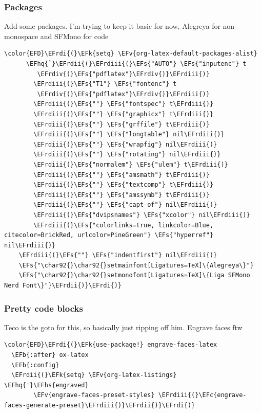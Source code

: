 \documentclass{scrartcl}
\newcommand{\EFk}[1]{\textcolor{EFk}{#1}} %
\newcommand{\EFs}[1]{\textcolor{EFs}{#1}} %
\newcommand{\EFb}[1]{\textcolor{EFb}{#1}} %
\newcommand{\EFc}[1]{\textcolor{EFc}{#1}} %
\newcommand{\EFv}[1]{\textcolor{EFv}{#1}} %
\newcommand{\EFhq}[1]{#1} %
\newcommand{\EFhs}[1]{#1} %
\newcommand{\EFrdi}[1]{#1} %
\newcommand{\EFrdii}[1]{#1} %
\newcommand{\EFrdiii}[1]{#1} %
\newcommand{\EFrdiv}[1]{#1} %
\begin{document}
\subsubsection{Packages}
\label{sec:orge36119a}
Add some packages. I'm trying to keep it basic for now, Alegreya for
non-monospace and SFMono for code
\begin{Code}
\begin{Verbatim}[]
\color{EFD}\EFrdi{(}\EFk{setq} \EFv{org-latex-default-packages-alist}
      \EFhq{`}\EFrdii{(}\EFrdiii{(}\EFs{"AUTO"} \EFs{"inputenc"} t
         \EFrdiv{(}\EFs{"pdflatex"}\EFrdiv{)}\EFrdiii{)}
        \EFrdiii{(}\EFs{"T1"} \EFs{"fontenc"} t
         \EFrdiv{(}\EFs{"pdflatex"}\EFrdiv{)}\EFrdiii{)}
        \EFrdiii{(}\EFs{""} \EFs{"fontspec"} t\EFrdiii{)}
        \EFrdiii{(}\EFs{""} \EFs{"graphicx"} t\EFrdiii{)}
        \EFrdiii{(}\EFs{""} \EFs{"grffile"} t\EFrdiii{)}
        \EFrdiii{(}\EFs{""} \EFs{"longtable"} nil\EFrdiii{)}
        \EFrdiii{(}\EFs{""} \EFs{"wrapfig"} nil\EFrdiii{)}
        \EFrdiii{(}\EFs{""} \EFs{"rotating"} nil\EFrdiii{)}
        \EFrdiii{(}\EFs{"normalem"} \EFs{"ulem"} t\EFrdiii{)}
        \EFrdiii{(}\EFs{""} \EFs{"amsmath"} t\EFrdiii{)}
        \EFrdiii{(}\EFs{""} \EFs{"textcomp"} t\EFrdiii{)}
        \EFrdiii{(}\EFs{""} \EFs{"amssymb"} t\EFrdiii{)}
        \EFrdiii{(}\EFs{""} \EFs{"capt-of"} nil\EFrdiii{)}
        \EFrdiii{(}\EFs{"dvipsnames"} \EFs{"xcolor"} nil\EFrdiii{)}
        \EFrdiii{(}\EFs{"colorlinks=true, linkcolor=Blue, citecolor=BrickRed, urlcolor=PineGreen"} \EFs{"hyperref"} nil\EFrdiii{)}
    \EFrdiii{(}\EFs{""} \EFs{"indentfirst"} nil\EFrdiii{)}
    \EFs{"\char92{}\char92{}setmainfont[Ligatures=TeX]\{Alegreya\}"}
    \EFs{"\char92{}\char92{}setmonofont[Ligatures=TeX]\{Liga SFMono Nerd Font\}"}\EFrdii{)}\EFrdi{)}
\end{Verbatim}
\end{Code}

\subsubsection{Pretty code blocks}
\label{sec:orga47c17e}
Teco is the goto for this, so basically just ripping off him. Engrave faces ftw
\begin{Code}
\begin{Verbatim}[]
\color{EFD}\EFrdi{(}\EFk{use-package!} engrave-faces-latex
  \EFb{:after} ox-latex
  \EFb{:config}
  \EFrdii{(}\EFk{setq} \EFv{org-latex-listings} \EFhq{'}\EFhs{engraved}
        \EFv{engrave-faces-preset-styles} \EFrdiii{(}\EFc{engrave-faces-generate-preset}\EFrdiii{)}\EFrdii{)}\EFrdi{)}
\end{Verbatim}
\end{Code}
\end{document}
